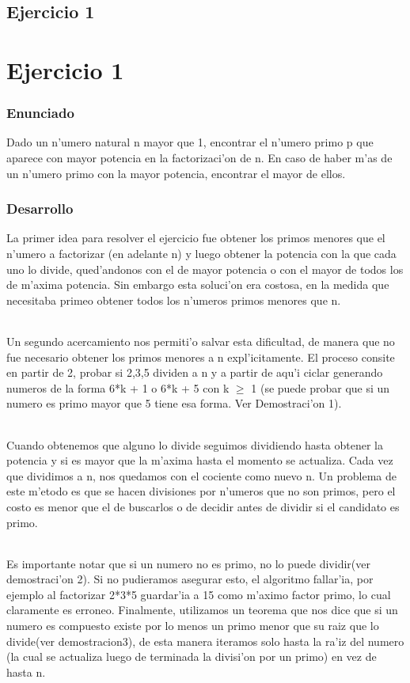 \chapter{Ejercicio 1}
\part{Ejercicio 1}
\section{Enunciado}
Dado un n'umero natural n mayor que 1, encontrar el n'umero primo p que aparece con mayor potencia en la factorizaci'on de n. En caso de haber m'as de un n'umero primo con  la mayor potencia, encontrar el mayor de ellos.

\section{Desarrollo}
La primer idea para resolver el ejercicio fue obtener los primos menores que el n'umero a factorizar
(en adelante n) y luego obtener la potencia con la que cada uno lo divide, qued'andonos con el de mayor
potencia o con el mayor de todos los de m'axima potencia. Sin embargo esta soluci'on era costosa, en la medida
que necesitaba primeo obtener todos los n'umeros primos menores que n.
\paragraph{}
Un segundo acercamiento nos permiti'o salvar esta dificultad, de manera que no fue necesario obtener los primos menores a n expl'icitamente. El proceso consite en partir de 2, probar si 2,3,5 dividen a n y a partir  de aqu'i ciclar generando numeros de la forma 6*k + 1 o 6*k + 5 con k $\geq$ 1 (se puede probar que si un numero es primo mayor que 5 tiene esa forma. Ver Demostraci'on 1).
\paragraph{}
Cuando obtenemos que alguno lo divide seguimos dividiendo hasta obtener la potencia y si es mayor que la m'axima hasta el momento se actualiza. Cada vez que dividimos a n, nos quedamos con el cociente como nuevo n. Un problema de este m'etodo es que se hacen  divisiones por n'umeros que no son primos, pero el costo es menor que el de buscarlos o de decidir antes de  dividir si el candidato es primo. 
\paragraph{}
Es importante notar que si un numero no es primo, no lo puede dividir(ver demostraci'on 2). Si no pudieramos asegurar esto, el algoritmo fallar'ia, por ejemplo al factorizar 2*3*5 guardar'ia a 15 como m'aximo factor primo, lo cual claramente es erroneo. Finalmente, utilizamos un teorema que nos dice que si un numero es compuesto existe por lo menos un primo menor que su raiz que lo divide(ver demostracion3), de esta manera iteramos solo hasta la ra'iz del numero (la cual se actualiza luego de terminada la divisi'on por un primo) en vez de hasta n.

